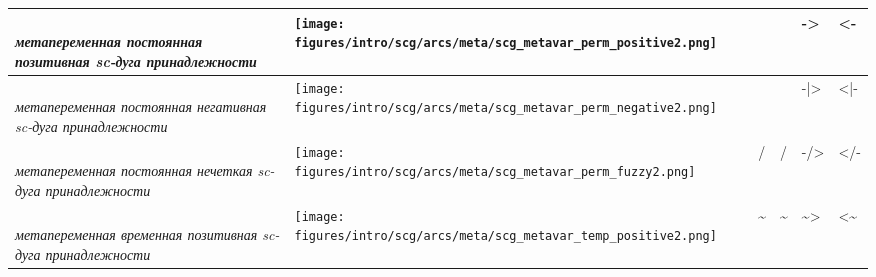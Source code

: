 \begin{SCn}
{\begin{longtable}[l]{|m{4.6cm}|m{3.5cm}|m{2cm}|m{2cm}|m{2cm}|m{2cm}|}
	\parbox[m]{4.6cm}{\textit{\\метапеременная постоянная позитивная sc-дуга принадлежности\\}} & \parbox[m]{3.5cm}{\centering \texttt{[image: figures/intro/scg/arcs/meta/scg\_metavar\_perm\_positive2.png]}} & \parbox[m]{2cm}{\centering\textunderscore \textunderscore\ni} & \parbox[m]{2cm}{\centering\in\textunderscore\textunderscore} & \parbox[m]{2cm}{\centering\textunderscore\textunderscore->} & \parbox[m]{2cm}{\centering <-\textunderscore\textunderscore} \\
	\hline
	
	\parbox[m]{4.6cm}{\textit{\\ метапеременная постоянная негативная sc-дуга принадлежности \\}} & \parbox[m]{3.5cm}{\centering \texttt{[image: figures/intro/scg/arcs/meta/scg\_metavar\_perm\_negative2.png]}} & \parbox[m]{2cm}{\centering \textunderscore\textunderscore \not\ni} & \parbox[m]{2cm}{\centering \notin\textunderscore\textunderscore} & \parbox[m]{2cm}{\centering \textunderscore\textunderscore-|>} & \parbox[m]{2cm}{\centering <|-\textunderscore\textunderscore} \\
	\hline
	
	\parbox[m]{4.6cm}{\textit{\\ метапеременная постоянная нечеткая sc-дуга принадлежности \\}} & \parbox[m]{3.5cm}{\centering \texttt{[image: figures/intro/scg/arcs/meta/scg\_metavar\_perm\_fuzzy2.png]}} & \parbox[m]{2cm}{\centering\textunderscore\textunderscore/\ni} & \parbox[m]{2cm}{\centering\in/\textunderscore\textunderscore} & \parbox[m]{2cm}{\centering\textunderscore\textunderscore-/>} & \parbox[m]{2cm}{\centering </-\textunderscore\textunderscore} \\
	\hline
	
	\parbox[m]{4.6cm}{\textit{\\ метапеременная временная позитивная sc-дуга принадлежности \\}} & \parbox[m]{3.5cm}{\centering \texttt{[image: figures/intro/scg/arcs/meta/scg\_metavar\_temp\_positive2.png]}} & \parbox[m]{2cm}{\centering\textunderscore\textunderscore\sim\ni} & \parbox[m]{2cm}{\centering\in\sim\textunderscore\textunderscore} & \parbox[m]{2cm}{\centering\textunderscore\textunderscore\sim>} & \parbox[m]{2cm}{\centering <\sim\textunderscore\textunderscore} \\
	\hline
	

\end{longtable}}
\end{SCn}
